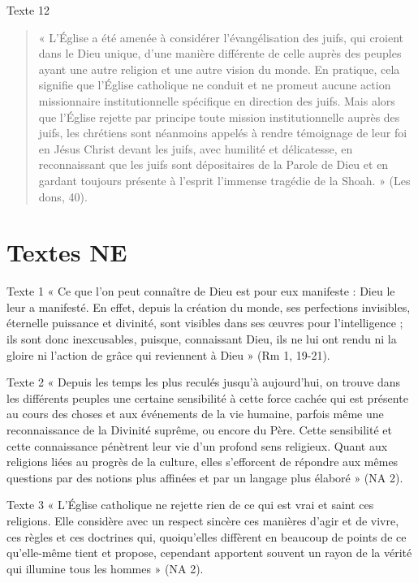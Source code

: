 Texte  12 \begin{quote}
     «  L’Église  a  été  amenée  à  considérer  l’évangélisation  des  juifs,  qui  croient  dans  le  Dieu unique,  d’une  manière  différente  de  celle  auprès  des  peuples  ayant  une  autre  religion  et  une autre  vision  du  monde.  En  pratique,  cela  signifie  que  l’Église  catholique  ne  conduit  et  ne promeut  aucune  action  missionnaire  institutionnelle  spécifique  en  direction  des  juifs.  Mais alors  que  l’Église  rejette  par  principe  toute  mission  institutionnelle  auprès  des  juifs,  les chrétiens  sont  néanmoins  appelés  à  rendre  témoignage  de  leur  foi  en  Jésus  Christ  devant  les juifs,  avec  humilité  et  délicatesse,  en  reconnaissant  que  les  juifs  sont  dépositaires  de  la  Parole de  Dieu  et  en  gardant  toujours  présente  à  l’esprit  l’immense  tragédie  de  la  Shoah.  »  (Les  dons, 40). 
\end{quote} 


\section{Textes NE}

Texte  1 «  Ce  que  l’on  peut  connaître  de  Dieu  est  pour  eux  manifeste  :  Dieu  le  leur  a  manifesté.  En effet,  depuis  la  création  du  monde,  ses  perfections  invisibles,  éternelle  puissance  et  divinité, sont  visibles  dans  ses  œuvres  pour  l’intelligence  ;  ils  sont  donc  inexcusables,  puisque, connaissant  Dieu,  ils  ne  lui  ont  rendu  ni  la  gloire  ni  l’action  de  grâce  qui  reviennent  à  Dieu  » (Rm  1, 19-21). 


Texte  2 «  Depuis  les  temps  les  plus  reculés  jusqu’à  aujourd’hui,  on  trouve  dans  les  différents  peuples une  certaine  sensibilité  à  cette  force  cachée  qui  est  présente  au  cours  des  choses  et  aux événements  de  la  vie  humaine,  parfois  même  une  reconnaissance  de  la  Divinité  suprême,  ou encore  du  Père.  Cette  sensibilité  et  cette  connaissance  pénètrent  leur  vie  d’un  profond  sens religieux.  Quant  aux  religions  liées  au  progrès  de  la  culture,  elles  s’efforcent  de  répondre  aux mêmes  questions  par des  notions  plus  affinées  et  par un langage  plus  élaboré  »  (NA  2). 


Texte  3 «  L’Église  catholique  ne  rejette  rien  de  ce  qui  est  vrai  et  saint  ces  religions.  Elle  considère avec  un  respect  sincère  ces  manières  d’agir  et  de  vivre,  ces  règles  et  ces  doctrines  qui, quoiqu’elles  diffèrent  en  beaucoup  de  points  de  ce  qu’elle-même  tient  et  propose,  cependant apportent  souvent  un rayon de  la  vérité  qui  illumine  tous  les  hommes  »  (NA  2). 


